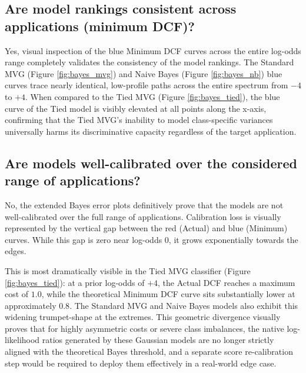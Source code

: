 \subsection*{Are model rankings consistent across applications (minimum DCF)?}

Yes, visual inspection of the blue Minimum DCF curves across the entire log-odds range completely validates the consistency of the model rankings. The Standard MVG (Figure \ref{fig:bayes_mvg}) and Naive Bayes (Figure \ref{fig:bayes_nb}) blue curves trace nearly identical, low-profile paths across the entire spectrum from $-4$ to $+4$. When compared to the Tied MVG (Figure \ref{fig:bayes_tied}), the blue curve of the Tied model is visibly elevated at all points along the x-axis, confirming that the Tied MVG's inability to model class-specific variances universally harms its discriminative capacity regardless of the target application.

\subsection*{Are models well-calibrated over the considered range of applications?}

No, the extended Bayes error plots definitively prove that the models are not well-calibrated over the full range of applications. Calibration loss is visually represented by the vertical gap between the red (Actual) and blue (Minimum) curves. While this gap is zero near log-odds $0$, it grows exponentially towards the edges. 

This is most dramatically visible in the Tied MVG classifier (Figure \ref{fig:bayes_tied}): at a prior log-odds of $+4$, the Actual DCF reaches a maximum cost of $1.0$, while the theoretical Minimum DCF curve sits substantially lower at approximately $0.8$. The Standard MVG and Naive Bayes models also exhibit this widening trumpet-shape at the extremes. This geometric divergence visually proves that for highly asymmetric costs or severe class imbalances, the native log-likelihood ratios generated by these Gaussian models are no longer strictly aligned with the theoretical Bayes threshold, and a separate score re-calibration step would be required to deploy them effectively in a real-world edge case.